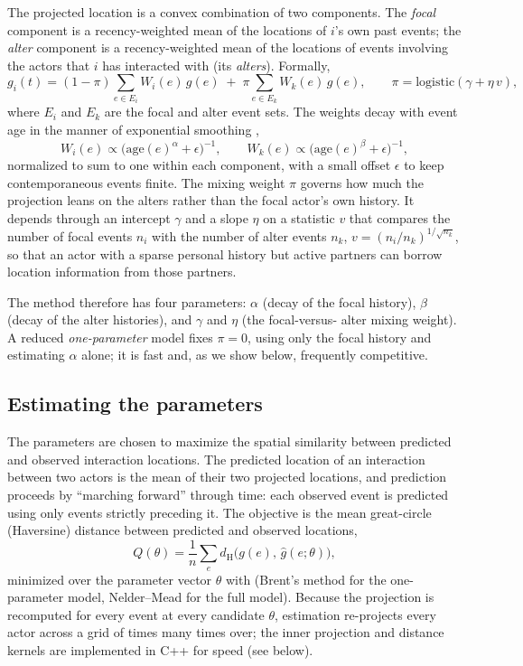 The projected location is a convex combination of two components. The
\emph{focal} component is a recency-weighted mean of the locations of $i$'s own
past events; the \emph{alter} component is a recency-weighted mean of the
locations of events involving the actors that $i$ has interacted with (its
\emph{alters}). Formally,
%
\begin{equation}
  g_i(t) = (1-\pi)\sum_{e \in E_i} W_i(e)\, g(e)
         \;+\; \pi \sum_{e \in E_k} W_k(e)\, g(e),
  \qquad
  \pi = \mathrm{logistic}(\gamma + \eta\, v),
  \label{eq:pals}
\end{equation}
%
where $E_i$ and $E_k$ are the focal and alter event sets. The weights decay with
event age in the manner of exponential smoothing \citep{gardner2006},
%
\begin{equation}
  W_i(e) \propto \bigl(\text{age}(e)^{\alpha} + \epsilon\bigr)^{-1},
  \qquad
  W_k(e) \propto \bigl(\text{age}(e)^{\beta} + \epsilon\bigr)^{-1},
\end{equation}
%
normalized to sum to one within each component, with a small offset $\epsilon$ to
keep contemporaneous events finite. The mixing weight $\pi$ governs how much the
projection leans on the alters rather than the focal actor's own history. It
depends through an intercept $\gamma$ and a slope $\eta$ on a statistic $v$ that
compares the number of focal events $n_i$ with the number of alter events $n_k$,
$v = (n_i / n_k)^{1/\sqrt{n_k}}$, so that an actor with a sparse personal history
but active partners can borrow location information from those partners.

The method therefore has four parameters: $\alpha$ (decay of the focal history),
$\beta$ (decay of the alter histories), and $\gamma$ and $\eta$ (the focal-versus-
alter mixing weight). A reduced \emph{one-parameter} model fixes $\pi = 0$, using
only the focal history and estimating $\alpha$ alone; it is fast and, as we show
below, frequently competitive.

\subsection{Estimating the parameters}

The parameters are chosen to maximize the spatial similarity between predicted and
observed interaction locations. The predicted location of an interaction between
two actors is the mean of their two projected locations, and prediction proceeds
by ``marching forward'' through time: each observed event is predicted using only
events strictly preceding it. The objective is the mean great-circle (Haversine)
distance between predicted and observed locations,
%
\begin{equation}
  Q(\theta) = \frac{1}{n}\sum_{e} d_{\mathrm{H}}\!\bigl(g(e),\,
              \hat g(e;\theta)\bigr),
\end{equation}
%
minimized over the parameter vector $\theta$ with  (Brent's
method for the one-parameter model, Nelder--Mead for the full model). Because the
projection is recomputed for every event at every candidate $\theta$, estimation
re-projects every actor across a grid of times many times over; the inner
projection and distance kernels are implemented in C++ for speed (see below).

